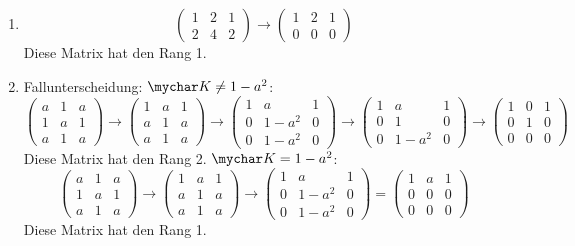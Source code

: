 \documentclass{article}
\begin{document}
\begin{enumerate}
        \item $$\begin{pmatrix}1 & 2 & 1\\ 2 & 4 & 2\end{pmatrix} \to\begin{pmatrix}1 & 2 & 1\\ 0 & 0 & 0\end{pmatrix}$$ Diese Matrix hat den Rang 1.
        \item Fallunterscheidung: 
            \subitem $\mychar K \neq 1 - a^2$: $$\begin{pmatrix}a & 1 & a\\ 1 & a & 1 \\ a & 1 & a\end{pmatrix} \to \begin{pmatrix}1 & a & 1\\ a & 1 & a \\ a & 1 & a\end{pmatrix} \to \begin{pmatrix}1 & a & 1\\ 0 & 1-a^2 & 0 \\ 0 & 1-a^2 & 0\end{pmatrix}\to \begin{pmatrix}1 & a & 1\\ 0 & 1 & 0 \\ 0 & 1-a^2 & 0\end{pmatrix} \to \begin{pmatrix}1 & 0 & 1\\ 0 & 1 & 0 \\ 0 & 0 & 0\end{pmatrix}$$ Diese Matrix hat den Rang 2.
            \subitem $\mychar K = 1 - a^2$: $$\begin{pmatrix}a & 1 & a\\ 1 & a & 1 \\ a & 1 & a\end{pmatrix} \to \begin{pmatrix}1 & a & 1\\ a & 1 & a \\ a & 1 & a\end{pmatrix} \to \begin{pmatrix}1 & a & 1\\ 0 & 1-a^2 & 0 \\ 0 & 1-a^2 & 0\end{pmatrix} = \begin{pmatrix}1 & a & 1\\ 0 & 0 & 0 \\ 0 & 0 & 0\end{pmatrix}$$ Diese Matrix hat den Rang 1.
    \end{enumerate}
\end{document}
